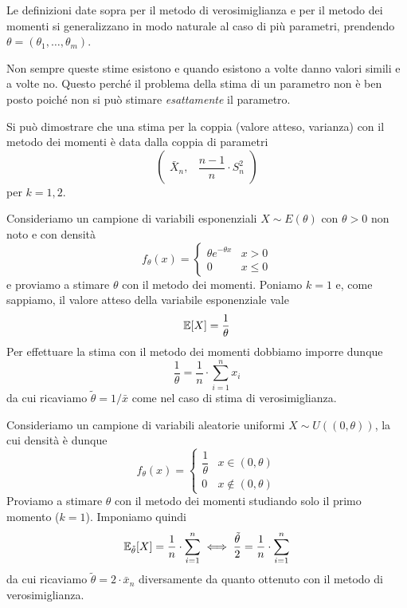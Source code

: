 Le definizioni date sopra per il metodo di verosimiglianza e per il metodo dei momenti si
generalizzano in modo naturale al caso di più parametri, prendendo
$\theta = (\theta_1, \dots, \theta_m)$.

Non sempre queste stime esistono e quando esistono a volte danno valori simili e a volte no. Questo
perché il problema della stima di un parametro non è ben posto poiché non si può stimare
\emph{esattamente} il parametro.

Si può dimostrare che una stima per la coppia (valore atteso, varianza) con il metodo dei momenti
è data dalla coppia di parametri
\[ \begin{pmatrix} \bar{X}_n, & \dfrac{n-1}{n} \cdot S_n^2 \end{pmatrix} \]
per $k = 1, 2$.

\begin{example}
	Consideriamo un campione di variabili esponenziali $X \sim E(\theta)$ con $\theta > 0$ non noto
	e con densità
	\[
		f_\theta(x) = \begin{cases}
			\theta e^{-\theta x} & x > 0    \\
			0                    & x \leq 0
		\end{cases}
	\]
	e proviamo a stimare $\theta$ con il metodo dei momenti. Poniamo $k=1$ e, come sappiamo, il
	valore atteso della variabile esponenziale vale
	\[ \mathbb{E}[X] = \frac{1}{\theta} \]
	Per effettuare la stima con il metodo dei momenti dobbiamo imporre dunque
	\[ \frac{1}{\theta} = \frac{1}{n} \cdot \sum_{i=1}^n x_i \]
	da cui ricaviamo $\tilde{\theta} = 1 / \bar{x}$ come nel caso di stima di verosimiglianza.
\end{example}

\begin{example}
	Consideriamo un campione di variabili aleatorie uniformi $X \sim U((0, \theta))$, la cui
	densità è dunque
	\[
		f_\theta(x) = \begin{cases}
			\dfrac{1}{\theta} & x \in (0, \theta)    \\[2ex]
			0                 & x \notin (0, \theta)
		\end{cases}
	\]
	Proviamo a stimare $\theta$ con il metodo dei momenti studiando solo il primo momento ($k=1$).
	Imponiamo quindi
	\[
		\mathbb{E}_{\tilde{\theta}}[X] = \frac{1}{n} \cdot \sum_{i=1}^n \iff
		\frac{\tilde{\theta}}{2} = \frac{1}{n} \cdot \sum_{i=1}^n
	\]
	da cui ricaviamo $\tilde{\theta} = 2 \cdot \bar{x}_n$ diversamente da quanto ottenuto
	con il metodo di verosimiglianza.
\end{example}
